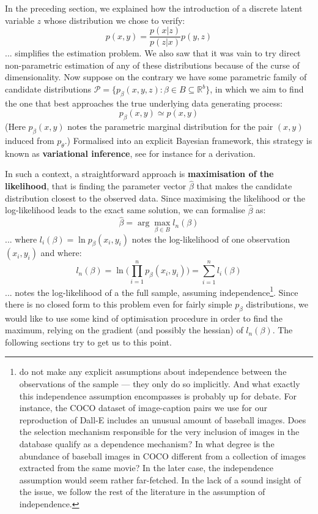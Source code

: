 \documentclass{article}
\begin{document}
\begin{appendix}
In the preceding section, we explained how the introduction of a discrete latent variable $z$ whose distribution we chose to verify:
\begin{equation} \label{pdecompose}
p(x,y)=\frac{p(x|z)}{p(z|x)}p(y,z)
\end{equation}
... simplifies the estimation problem. We also saw that it was vain to try direct non-parametric estimation of any of these distributions because of the curse of dimensionality. Now suppose on the contrary we have some parametric family of candidate distributions $\mathcal{P}=\{p_\beta(x,y,z): \beta \in B\subseteq \mathbb{R}^b\}$, in which we aim to find the one that best approaches the true underlying data generating process:
$$p_\beta(x,y)\simeq p(x,y)$$
(Here $p_\beta(x,y)$ notes the parametric marginal distribution for the pair $(x,y)$ induced from $p_\theta$.) Formalised into an explicit Bayesian framework, this strategy is known as \textbf{variational inference}, see for instance \citet{probml-advanced} for a derivation.

In such a context, a straightforward approach is \textbf{maximisation of the likelihood}, that is finding the parameter vector $\hat  \beta$ that makes the candidate distribution closest to the observed data. Since maximising the likelihood or the log-likelihood leads to the exact same solution, we can formalise $\hat \beta$ as:
$$\hat \beta=\arg\max_{\beta \in B} l_n(\beta)$$
... where $l_i(\beta)=\ln p_\beta(x_i,y_i)$ notes the log-likelihood of one observation $(x_i,y_i)$ and where: $$l_n(\beta) = \ln \Big( \prod_{i=1}^{n} p_\beta(x_i,y_i) \Big)=\sum_{i=1}^{n} l_i(\beta) $$ ... notes the log-likelihood of a the full sample, assuming independence\footnote{\citet{zeroshot} do not make any explicit assumptions about independence between the observations of the sample — they only do so implicitly. And what exactly this independence assumption encompasses is probably up for debate. For instance, the COCO dataset of image-caption pairs we use for our reproduction of Dall-E includes an unusual amount of baseball images. Does the selection mechanism responsible for the very inclusion of images in the database qualify as a dependence mechanism? In what degree is the abundance of baseball images in COCO different from a collection of images extracted from the same movie? In the later case, the independence assumption would seem rather far-fetched. In the lack of a sound insight of the issue, we follow the rest of the literature in the assumption of independence.}. Since there is no closed form to this problem even for fairly simple $p_\beta$ distributions, we would like to use some kind of optimisation procedure in order to find the maximum, relying on the gradient (and possibly the hessian) of $l_n(\beta)$. The following sections try to get us to this point.


\end{appendix}
\end{document}
